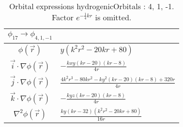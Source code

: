 \begin{table}
\begin{center}
\begin{tabular}{c|l}
$\phi_{17} \rightarrow \phi_{4, 1, -1}$\\
\hline
$\phi(\vec r)$ & $y \left(k^{2} r^{2} - 20 k r + 80\right)$\\
\hline
$\vec i\cdot \nabla \phi(\vec r)$ & $- \frac{k x y \left(k r -20\right) \left(k r -8\right)}{4 r}$\\
$\vec j\cdot \nabla \phi(\vec r)$ & $\frac{4 k^{2} r^{3} - 80 k r^{2} - k y^{2} \left(k r -20\right) \left(k r -8\right) + 320 r}{4 r}$\\
$\vec k\cdot \nabla \phi(\vec r)$ & $- \frac{k y z \left(k r -20\right) \left(k r -8\right)}{4 r}$\\
\hline
$\nabla^2 \phi(\vec r)$ & $\frac{k y \left(k r -32\right) \left(k^{2} r^{2} - 20 k r + 80\right)}{16 r}$\\
\end{tabular}
\caption{Orbital expressions hydrogenicOrbitals : 4, 1, -1. Factor $e^{- \frac{1}{4} k r}$ is omitted.}
\end{center}
\end{table}

\clearpage
